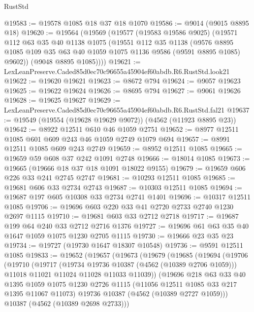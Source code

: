 \begin{lexlean}{RustStd}
\begin{coremodule}
@19583 := @19578 @1085 @18 @37 @18 @1070
@19586 := @9014 (@9015 @8895 @18)
@19620 := @19564
    (@19569
      (@19577
        (@19583 @19586 @9025)
        (@19571
          @112
          @63
          @35
          @40
          @1138
          @1075
          (@19551
            @112
            @35
            @1138
            (@9576 @8895 @1085 @109 @35 @63 @40 @1059 @1075 @1136 @9586 (@9591 @8895 @1085) @9602))
          (@9048 @8895 @1085))))
@19621 := LexLeanPreserve.Caded85d0ec70c96655a45904ef60abdb.R6.RustStd.look21
@19622 := @19620 @19621
@19623 := @8672 @794
@19624 := @9057 @19623
@19625 := @19622 @19624
@19626 := @8695 @794
@19627 := @9061 @19626
@19628 := @19625 @19627
@19629 := LexLeanPreserve.Caded85d0ec70c96655a45904ef60abdb.R6.RustStd.fal21
@19637 := @19549 (@19554 (@19628 @19629 @9072)) (@4562 (@11923 @8895 @23))
@19642 := @8922 @12511 @610 @46 @1059 @2751
@19652 := @8977 @12511 @1085 @601 @609 @243 @46 @1059 @2749 @1079 @694
@19657 := @8991 @12511 @1085 @609 @243 @2749
@19659 := @8952 @12511 @1085
@19665 := @19659 @59 @608 @37 @242 @1091 @2748
@19666 := @18014 @1085
@19673 := @19665 (@19666 @18 @37 @18 @1091 @18022 @9155)
@19679 := @19659 @606 @226 @33 @241 @2745 @2747
@19681 := @10293 @12511 @1085
@19685 := @19681 @606 @33 @2734 @2743
@19687 := @10303 @12511 @1085
@19694 := @19687 @197 @605 @10308 @33 @2734 @2741 @1401
@19696 := @10317 @12511 @1085
@19706 := @19696 @603 @220 @33 @41 @2720 @2733 @2740 @1230 @2697 @1115
@19710 := @19681 @603 @33 @2712 @2718
@19717 := @19687 @199 @64 @240 @33 @2712 @2716 @1376
@19727 := @19696 @61 @63 @35 @40 @1647 @1059 @1075 @1230 @2705 @1115
@19730 := @19666 @23 @35 @23
@19734 := @19727 (@19730 @1647 @18307 @10548)
@19736 := @9591 @12511 @1085
@19833 := @19652
    (@19657
      (@19673
        (@19679
          (@19685
            (@19694
              (@19706
                (@19710
                  (@19717
                    (@19734 @19736 @10387 (@4562 (@10389 @2706 @1059)))
                    @11018
                    @11021
                    @11024
                    @11028
                    @11033
                    @11039))
                (@19696
                  @218
                  @63
                  @33
                  @40
                  @1395
                  @1059
                  @1075
                  @1230
                  @2726
                  @1115
                  (@11056 @12511 @1085 @33 @217 @1395 @11067 @11073)
                  @19736
                  @10387
                  (@4562 (@10389 @2727 @1059)))
                @10387
                (@4562 (@10389 @2698 @2733)))

\end{coremodule}
\end{lexlean}
